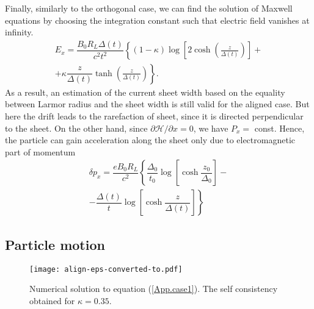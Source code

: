 \documentclass[useAMS,usenatbib]{mn2e}
\begin{document}
Finally, similarly to the orthogonal case, we can find the solution of Maxwell equations by choosing 
the integration constant such that electric field vanishes at infinity.
\begin{equation}
\label{Appendix:ex.al}
\begin{split}
E_{x} = \dfrac{B_0R_L\Delta(t)}{c^2t^2}
\left\{(1-\kappa)\log\left[2\cosh\left(\frac{z}{\Delta(t)}\right)\right]+\right.\\
\left.+\kappa\dfrac{z}{\Delta(t)}\tanh\left(\frac{z}{\Delta(t)}\right)\right\}.
\end{split}
\end{equation}
As a result, an estimation of the current sheet width based on the equality between 
Larmor radius and the sheet width is still valid for the aligned case. But here the drift leads  
to the rarefaction of sheet, since it is directed perpendicular to the sheet. On the other hand, since 
$\partial\mathcal{H}/\partial x =0$, we have $P_{x} =$ const. Hence, the particle can gain acceleration along the sheet only due to electromagnetic part of momentum
\begin{equation}
\begin{split}
\delta p_x=\dfrac{eB_0R_L}{c^2}\left\{\dfrac{\Delta_0}{t_0}
\log\left[\cosh\dfrac{z_0}{\Delta_0}\right]\right.
-\\-\left.
\dfrac{\Delta(t)}{t}
\log\left[\cosh\dfrac{z}{\Delta(t)}\right]\right\}
\end{split}
\end{equation}
 
\subsection{Particle motion}
\label{sect:al}

\begin{figure}
\centering
\texttt{[image: align-eps-converted-to.pdf]}
\caption{Numerical solution to equation (\ref{App.case1}). The self consistency obtained for $\kappa=0.35$. }
\label{fig:App.sol}
\end{figure}
\end{document}
